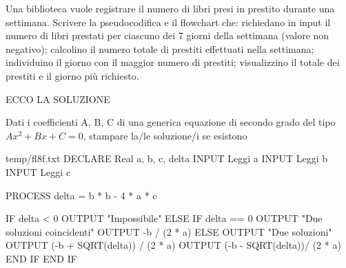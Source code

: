 \documentclass[11pt,fleqn]{book}
\begin{document}
\begin{esercizio}[3]
    Una biblioteca vuole registrare il numero di libri presi in prestito durante una settimana. Scrivere la pseudocodifica e il flowchart che: richiedano in input il numero di libri prestati per ciascuno dei 7 giorni della settimana (valore non negativo); calcolino il numero totale di prestiti effettuati nella settimana; individuino il giorno con il maggior numero di prestiti; visualizzino il totale dei prestiti e il giorno più richiesto.
    \ifsoluzioni
        \solution

        ECCO LA SOLUZIONE
    \fi
\end{esercizio}

\begin{esercizio}[1]
    Dati i coefficienti A, B, C di una generica equazione di secondo grado del tipo $Ax^2 + Bx + C = 0$, stampare la/le soluzione/i se esistono
    \ifsoluzioni
        \solution
        
        \begin{filecontents*}{temp/fl8f.txt}
        DECLARE Real a, b, c, delta
        INPUT Leggi a
        INPUT Leggi b
        INPUT Leggi c

        PROCESS delta = b * b - 4 * a * c

        IF delta < 0
            OUTPUT "Impossibile"
        ELSE
            IF delta == 0
                OUTPUT "Due soluzioni coincidenti"
                OUTPUT -b / (2 * a)
            ELSE
                OUTPUT "Due soluzioni"
                OUTPUT (-b + SQRT(delta)) / (2 * a)
                OUTPUT (-b - SQRT(delta))/ (2 * a)
            END IF
        END IF
        \end{filecontents*}

        \immediate{}
        
        \newpage

        \immediate{}
        
        \newpage
    \fi
\end{esercizio}
\end{document}
